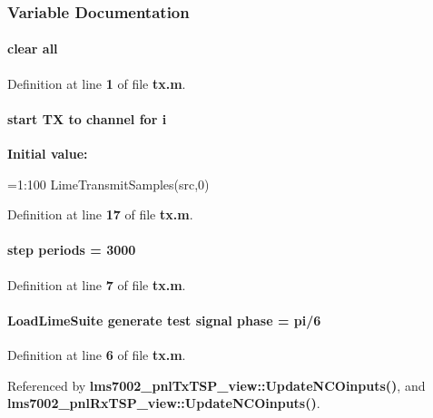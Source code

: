 \subsubsection{Variable Documentation}
\paragraph[{all}]{\setlength{\rightskip}{0pt plus 5cm}clear all}\label{tx_8m_a4603254d9990f7140c024d51302d1a8f}


Definition at line {\bf 1} of file {\bf tx.\+m}.

\paragraph[{i}]{\setlength{\rightskip}{0pt plus 5cm}start TX to channel for i}\label{tx_8m_a41e8073ed135dd0ebd062821682fe9e4}
{\bfseries Initial value\+:}
\begin{DoxyCode}
=1:100
    LimeTransmitSamples(src,0)
\end{DoxyCode}


Definition at line {\bf 17} of file {\bf tx.\+m}.

\paragraph[{periods}]{ step periods = 3000}\label{tx_8m_a55f5d1cef0f25b5af09db82e462128b5}


Definition at line {\bf 7} of file {\bf tx.\+m}.

\paragraph[{phase}]{\setlength{\rightskip}{0pt plus 5cm}Load\+Lime\+Suite generate test signal phase = pi/6}\label{tx_8m_abb6310603dc6ee11b661f6322ce02e70}


Definition at line {\bf 6} of file {\bf tx.\+m}.



Referenced by {\bf lms7002\+\_\+pnl\+Tx\+T\+S\+P\+\_\+view\+::\+Update\+N\+C\+Oinputs()}, and {\bf lms7002\+\_\+pnl\+Rx\+T\+S\+P\+\_\+view\+::\+Update\+N\+C\+Oinputs()}.

